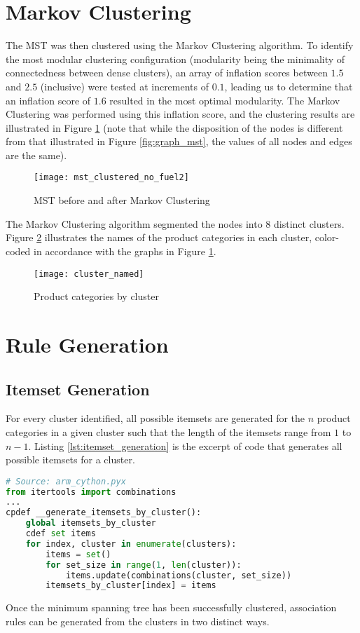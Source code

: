 \section{Markov Clustering}
The MST was then clustered using the Markov Clustering algorithm. To identify the most modular clustering configuration (modularity being the minimality of connectedness between dense clusters), an array of inflation scores between $1.5$ and $2.5$ (inclusive) were tested at increments of $0.1$, leading us to determine that an inflation score of $1.6$ resulted in the most optimal modularity. The Markov Clustering was performed using this inflation score, and the clustering results are illustrated in Figure \ref{fig:clustered} (note that while the disposition of the nodes is different from that illustrated in Figure \ref{fig:graph_mst}, the values of all nodes and edges are the same). 
\begin{figure}[H]
\centering
\texttt{[image: mst\_clustered\_no\_fuel2]}
\caption{MST before and after Markov Clustering}
\label{fig:clustered}
\end{figure}
The Markov Clustering algorithm segmented the nodes into 8 distinct clusters.
Figure \ref{fig:cluster_named} illustrates the names of the product categories in each cluster, color-coded in accordance with the graphs in Figure \ref{fig:clustered}.

\begin{figure}[H]
\centering
\texttt{[image: cluster\_named]}
\caption{Product categories by cluster}
\label{fig:cluster_named}
\end{figure}

\section{Rule Generation}

\subsection{Itemset Generation}
For every cluster identified, all possible itemsets are generated for the $n$ product categories in a given cluster such that the length of the itemsets range from $1$ to $n-1$. Listing \ref{lst:itemset_generation} is the excerpt of code that generates all possible itemsets for a cluster.

\begin{lstlisting}[language=Python, caption=Cluster Itemset Generation, label=lst:itemset_generation]
# Source: arm_cython.pyx
from itertools import combinations
...
cpdef __generate_itemsets_by_cluster():
    global itemsets_by_cluster
    cdef set items
    for index, cluster in enumerate(clusters):
        items = set()
        for set_size in range(1, len(cluster)):
            items.update(combinations(cluster, set_size))
        itemsets_by_cluster[index] = items
\end{lstlisting}
Once the minimum spanning tree has been successfully clustered, association rules can be generated from the clusters in two distinct ways.
